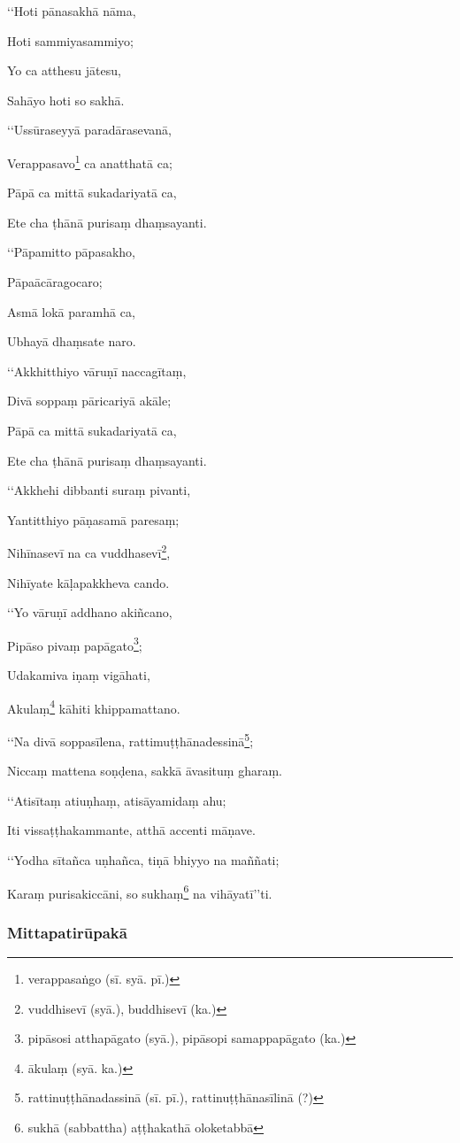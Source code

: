 ‘‘Hoti pānasakhā nāma,

Hoti sammiyasammiyo;

Yo ca atthesu jātesu,

Sahāyo hoti so sakhā.

‘‘Ussūraseyyā paradārasevanā,

Verappasavo\footnote{verappasaṅgo (sī. syā. pī.)} ca anatthatā ca;

Pāpā ca mittā sukadariyatā ca,

Ete cha ṭhānā purisaṃ dhaṃsayanti.

‘‘Pāpamitto pāpasakho,

Pāpaācāragocaro;

Asmā lokā paramhā ca,

Ubhayā dhaṃsate naro.

‘‘Akkhitthiyo vāruṇī naccagītaṃ,

Divā soppaṃ pāricariyā akāle;

Pāpā ca mittā sukadariyatā ca,

Ete cha ṭhānā purisaṃ dhaṃsayanti.

‘‘Akkhehi dibbanti suraṃ pivanti,

Yantitthiyo pāṇasamā paresaṃ;

Nihīnasevī na ca vuddhasevī\footnote{vuddhisevī (syā.), buddhisevī (ka.)},

Nihīyate kāḷapakkheva cando.

‘‘Yo vāruṇī addhano akiñcano,

Pipāso pivaṃ papāgato\footnote{pipāsosi atthapāgato (syā.), pipāsopi samappapāgato (ka.)};

Udakamiva iṇaṃ vigāhati,

Akulaṃ\footnote{ākulaṃ (syā. ka.)} kāhiti khippamattano.

‘‘Na divā soppasīlena, rattimuṭṭhānadessinā\footnote{rattinuṭṭhānadassinā (sī. pī.), rattinuṭṭhānasīlinā (?)};

Niccaṃ mattena soṇḍena, sakkā āvasituṃ gharaṃ.

‘‘Atisītaṃ atiuṇhaṃ, atisāyamidaṃ ahu;

Iti vissaṭṭhakammante, atthā accenti māṇave.

‘‘Yodha sītañca uṇhañca, tiṇā bhiyyo na maññati;

Karaṃ purisakiccāni, so sukhaṃ\footnote{sukhā (sabbattha) aṭṭhakathā oloketabbā} na vihāyatī’’ti.

\subsubsection{Mittapatirūpakā}

